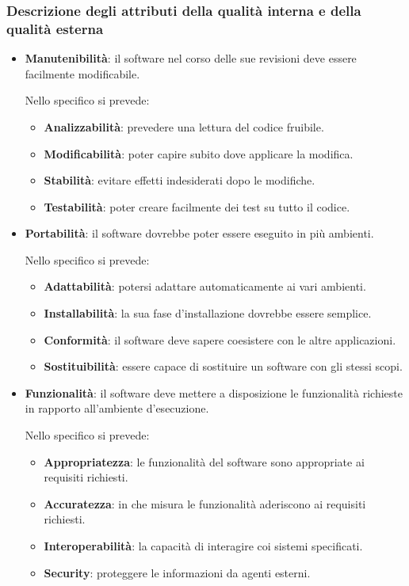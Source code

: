 		\subsubsection{Descrizione degli attributi della qualità interna e della qualità esterna}
		\begin{itemize}
			\item \textbf{Manutenibilità}: il software nel corso delle sue revisioni deve essere facilmente modificabile.

			Nello specifico si prevede:

			\begin{itemize}
				\item \textbf{Analizzabilità}: prevedere una lettura del codice fruibile.
				\item \textbf{Modificabilità}: poter capire subito dove applicare la modifica.
				\item \textbf{Stabilità}: evitare effetti indesiderati dopo le modifiche.
				\item \textbf{Testabilità}: poter creare facilmente dei test su tutto il codice.
			\end{itemize}

			\item \textbf{Portabilità}: il software dovrebbe poter essere eseguito in più ambienti.

			Nello specifico si prevede:

			\begin{itemize}
				\item \textbf{Adattabilità}: potersi adattare automaticamente ai vari ambienti.
				\item \textbf{Installabilità}: la sua fase d'installazione dovrebbe essere semplice.
				\item \textbf{Conformità}: il software deve sapere coesistere con le altre applicazioni.
				\item \textbf{Sostituibilità}: essere capace di sostituire un software con gli stessi scopi.
			\end{itemize}
			\newpage
			\item \textbf{Funzionalità}: il software deve mettere a disposizione le funzionalità richieste in rapporto all'ambiente d'esecuzione.

			Nello specifico si prevede:

			\begin{itemize}
				\item \textbf{Appropriatezza}: le funzionalità del software sono appropriate ai requisiti richiesti.
				\item \textbf{Accuratezza}: in che misura le funzionalità aderiscono ai requisiti richiesti.
				\item \textbf{Interoperabilità}: la capacità di interagire coi sistemi specificati.
				\item \textbf{Security}: proteggere le informazioni da agenti esterni.
			\end{itemize}


\end{itemize}
